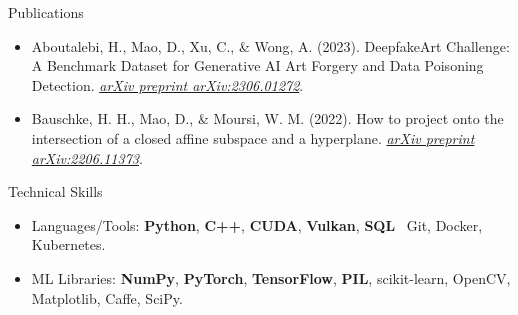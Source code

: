 \documentclass{resume}
\begin{document}
\begin{rSection}{Publications}
    \begin{itemize}
        \item Aboutalebi, H., Mao, D., Xu, C., \& Wong, A. (2023). DeepfakeArt Challenge: A Benchmark Dataset for Generative AI Art Forgery and Data Poisoning Detection. \href{https://arxiv.org/abs/2306.01272}{\textit{arXiv preprint arXiv:2306.01272}}.
        \item Bauschke, H. H., Mao, D., \& Moursi, W. M. (2022). How to project onto the intersection of a closed affine subspace and a hyperplane. \href{https://arxiv.org/abs/2206.11373}{\textit{arXiv preprint arXiv:2206.11373}}.
    \end{itemize}
\end{rSection}

\begin{rSection}{Technical Skills}

    \begin{itemize}
        \item Languages/Tools: \textbf{Python}, \textbf{C++}, \textbf{CUDA}, \textbf{Vulkan}, \textbf{SQL} \textbar\ Git, Docker, Kubernetes.
        \item ML Libraries: \textbf{NumPy}, \textbf{PyTorch}, \textbf{TensorFlow}, \textbf{PIL}, scikit-learn, OpenCV, Matplotlib, Caffe, SciPy.
    \end{itemize}

\end{rSection}
\end{document}
